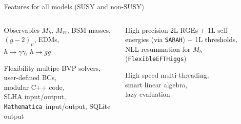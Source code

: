 \documentclass[hyperref={pdfpagelabels=false},ngerman]{beamer}
\newcommand{\SARAH}{\texttt{SARAH}}
\newcommand{\Mathematica}{\texttt{Mathematica}}
\begin{document}
\begin{frame}{Features for all models (SUSY and non-SUSY)}
  \begin{columns}[T]
    \begin{column}{0.49\textwidth}
      \begin{obsblock}{Observables}
        $M_h$, $M_W$, BSM masses, $(g-2)_\mu$, EDMs,\\
        $h\rightarrow\gamma\gamma$, $h\rightarrow gg$
      \end{obsblock}
      \begin{flexblock}{Flexibility}
        multipe BVP solvers, user-defined BCs,\\ modular C++ code, \\
        SLHA input/output, \Mathematica\ input/output, SQLite output
      \end{flexblock}
    \end{column}
    \begin{column}{0.49\textwidth}
      \begin{precblock}{High precision}
        2L RGEs + 1L self energies (via \SARAH) + 1L thresholds,\\
        NLL resummation for $M_h$ (\texttt{FlexibleEFTHiggs})
      \end{precblock}
      \begin{speedblock}{High speed}
        multi-threading,\\ smart linear algebra,\\ lazy evaluation
      \end{speedblock}
    \end{column}
  \end{columns}
\end{frame}

\newenvironment{modelblock}[1]{%
  \setbeamercolor{block body}{bg=darkyellow!15}
  \setbeamercolor{block title}{fg=black,bg=darkyellow}
  \begin{block}{#1}}{\end{block}}
\end{document}
